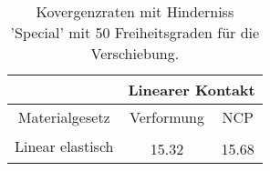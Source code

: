 \begin{table} 
\centering 
\begin{tabular}{c|cc|} 
\cline{2-3} 
 & \multicolumn{2}{|c|}{Linearer Kontakt} \\ 
\hline 
\multicolumn{1}{|c|}{Materialgesetz} & \multicolumn{1}{c|}{Verformung} & \multicolumn{1}{c|}{NCP} \\ 
\hline 
\multicolumn{1}{|c|}{\multirow{2}{*}{Linear elastisch}} &\multicolumn{1}{|c|}{} & \multicolumn{1}{|c|}{} \\ 
\multicolumn{1}{|c|}{} & \multicolumn{1}{|c|}{     15.32} & \multicolumn{1}{|c|}{     15.68} \\ 
\hline 
\end{tabular}\caption{Kovergenzraten mit Hinderniss 'Special' mit 50 Freiheitsgraden für die Verschiebung.}\label{tab:Rate_Special_level1}
\end{table} 
